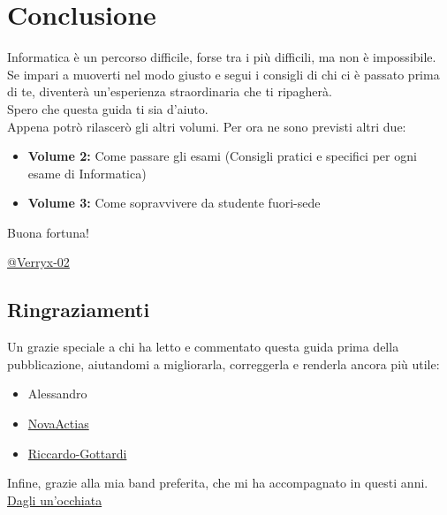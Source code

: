 \documentclass[18pt]{extarticle}
\begin{document}
\section{Conclusione}
Informatica è un percorso difficile, forse tra i più difficili, ma non è impossibile.\\
Se impari a muoverti nel modo giusto e segui i consigli di chi ci è passato prima di te, diventerà un'esperienza straordinaria che ti ripagherà.\\
Spero che questa guida ti sia d'aiuto.\\
Appena potrò rilascerò gli altri volumi. Per ora ne sono previsti altri due:
\begin{itemize}
\item \textbf{Volume 2:} Come passare gli esami (Consigli pratici e specifici per ogni esame di Informatica)
\item \textbf{Volume 3:} Come sopravvivere da studente fuori-sede
\end{itemize}

Buona fortuna!

\vspace{1cm}
\begin{flushright}
\href{https://github.com/Verryx-02}{@Verryx-02}
\end{flushright}

\subsection*{Ringraziamenti}
Un grazie speciale a chi ha letto e commentato questa guida prima della pubblicazione, aiutandomi a migliorarla, correggerla e renderla ancora più utile:
\begin{itemize}
\item Alessandro
\item \href{https://github.com/NovaActias}{NovaActias}
\item \href{https://github.com/Riccardo-Gottardi}{Riccardo-Gottardi}

\end{itemize}%
Infine, grazie alla mia band preferita, che mi ha accompagnato in questi anni. \href{https://www.youtube.com/watch?v=0dG9pXeOgT0}{Dagli un'occhiata}
\end{document}
